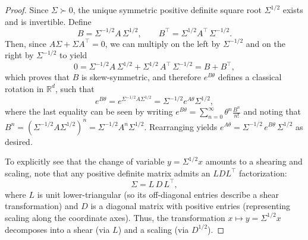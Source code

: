 \documentclass[twoside,11pt]{article}
\newcommand{\R} {\mathbb R}
\begin{document}
\begin{proof}
Since \(\Sigma \succ 0\), the unique symmetric positive definite square root \(\Sigma^{1/2}\) exists and is invertible. Define
\[
B = \Sigma^{-1/2} A\,\Sigma^{1/2}, \qquad B^\top =  \Sigma^{1/2} A^\top\,\Sigma^{-1/2}.
\]
Then, since \(A\Sigma + \Sigma A^\top  = 0\), we can multiply on the left by \(\Sigma^{-1/2}\) and on the right by \(\Sigma^{-1/2}\) to yield
\[
0 = \Sigma^{-1/2} A\,\Sigma^{1/2} + \Sigma^{1/2}\,A^\top \,\Sigma^{-1/2} = B + B^\top,
\]
which proves that \(B\) is skew-symmetric, and therefore \(e^{B\theta}\) defines a classical rotation in \(\R^d\), such that
\[
e^{B\theta} = e^{\Sigma^{-1/2}A\Sigma^{1/2}}=\Sigma^{-1/2}e^{A\theta}\Sigma^{1/2},
\]
where the last equality can be seen by writing $e^{B\theta} = \sum_{n=0}^{\infty} \theta^n \frac{B^n}{n!}$ and noting that $B^n = (\Sigma^{-1/2}A\Sigma^{1/2})^n = \Sigma^{-1/2}A^n\Sigma^{1/2}$. Rearranging yields $e^{A\theta} = \Sigma^{-1/2}\,e^{B\theta}\,\Sigma^{1/2}$ as desired.

To explicitly see that the change of variable \(y = \Sigma^{1/2} x\) amounts to a shearing and scaling, note that any positive definite matrix admits an \(LDL^\top \) factorization:
\[
\Sigma = L\,D\,L^\top ,
\]
where \(L\) is unit lower-triangular (so its off-diagonal entries describe a shear transformation) and \(D\) is a diagonal matrix with positive entries (representing scaling along the coordinate axes). Thus, the transformation \(x\mapsto y=\Sigma^{1/2} x\) decomposes into a shear (via \(L\)) and a scaling (via \(D^{1/2}\)). 
\end{proof}
\end{document}
